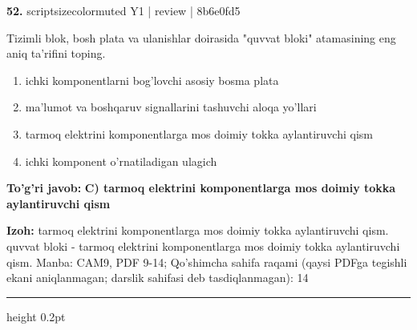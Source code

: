 \documentclass[10pt,a4paper]{article}
\begin{document}
{\bfseries\sffamily\color{ink} 52.} {scriptsizecolor{muted} Y1 | review | 8b6e0fd5}
\par
Tizimli blok, bosh plata va ulanishlar doirasida "quvvat bloki" atamasining eng aniq ta'rifini toping.
\begin{enumerate}[label=\Alph*),leftmargin=9mm]
\item ichki komponentlarni bog'lovchi asosiy bosma plata
\item ma'lumot va boshqaruv signallarini tashuvchi aloqa yo'llari
\item tarmoq elektrini komponentlarga mos doimiy tokka aylantiruvchi qism
\item ichki komponent o'rnatiladigan ulagich
\end{enumerate}
\begin{tcolorbox}[enhanced,breakable,colback=teal!4,colframe=teal!60!black,boxrule=0.45pt,arc=1.2mm,left=2.7mm,right=2.7mm,top=1.8mm,bottom=1.8mm,before skip=2mm,after skip=2mm]
{\bfseries\sffamily\color{teal}To'g'ri javob:} \textbf{C) tarmoq elektrini komponentlarga mos doimiy tokka aylantiruvchi qism}
\par\smallskip
{\bfseries Izoh:} tarmoq elektrini komponentlarga mos doimiy tokka aylantiruvchi qism. quvvat bloki - tarmoq elektrini komponentlarga mos doimiy tokka aylantiruvchi qism. Manba: CAM9, PDF 9-14; Qo'shimcha sahifa raqami (qaysi PDFga tegishli ekani aniqlanmagan; darslik sahifasi deb tasdiqlanmagan): 14
\end{tcolorbox}
\vspace{2mm}\hrule height 0.2pt\vspace{3mm}
\end{document}
